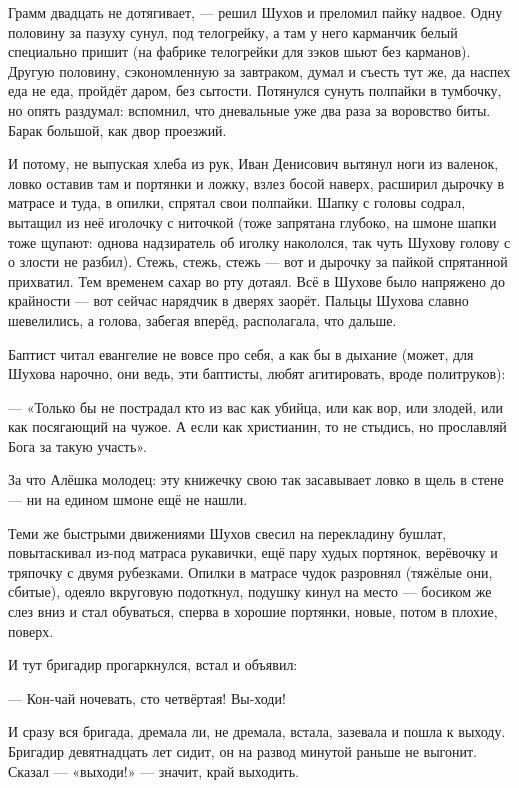 Грамм двадцать не дотягивает, --- решил Шухов и преломил пайку надвое. Одну половину за пазуху
сунул, под телогрейку, а там у него карманчик белый специально пришит (на фабрике телогрейки
для зэков шьют без карманов). Другую половину, сэкономленную за завтраком, думал и съесть тут
же, да наспех еда не еда, пройдёт даром, без сытости. Потянулся сунуть полпайки в тумбочку, но
опять раздумал: вспомнил, что дневальные уже два раза за воровство биты. Барак большой, как
двор проезжий.

И потому, не выпуская хлеба из рук, Иван Денисович вытянул ноги из валенок, ловко оставив там
и портянки и ложку, взлез босой наверх, расширил дырочку в матрасе и туда, в опилки, спрятал
свои полпайки. Шапку с головы содрал, вытащил из неё иголочку с ниточкой (тоже запрятана
глубоко, на шмоне шапки тоже щупают: однова надзиратель об иголку накололся, так чуть Шухову
голову с о злости не разбил). Стежь, стежь, стежь --- вот и дырочку за пайкой спрятанной
прихватил. Тем временем сахар во рту дотаял. Всё в Шухове было напряжено до крайности --- вот
сейчас нарядчик в дверях заорёт. Пальцы Шухова славно шевелились, а голова, забегая вперёд,
располагала, что дальше.

Баптист читал евангелие не вовсе про себя, а как бы в дыхание (может, для Шухова нарочно, они
ведь, эти баптисты, любят агитировать, вроде политруков):

--- «Только бы не пострадал кто из вас как убийца, или как вор, или злодей, или как посягающий
на чужое. А если как христианин, то не стыдись, но прославляй Бога за такую участь».

За что Алёшка молодец: эту книжечку свою так засавывает ловко в щель в стене --- ни на едином
шмоне ещё не нашли.

Теми же быстрыми движениями Шухов свесил на перекладину бушлат, повытаскивал из-под матраса
рукавички, ещё пару худых портянок, верёвочку и тряпочку с двумя рубезками. Опилки в матрасе
чудок разровнял (тяжёлые они, сбитые), одеяло вкруговую подоткнул, подушку кинул на место ---
босиком же слез вниз и стал обуваться, сперва в хорошие портянки, новые, потом в плохие,
поверх.

И тут бригадир прогаркнулся, встал и объявил:

--- Кон-чай ночевать, сто четвёртая! Вы-ходи!

И сразу вся бригада, дремала ли, не дремала, встала, зазевала и пошла к выходу. Бригадир
девятнадцать лет сидит, он на развод минутой раньше не выгонит. Сказал --- «выходи!» --- значит,
край выходить.

